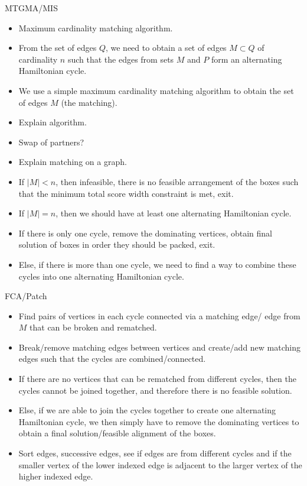 \documentclass[oribibl]{llncs}
\begin{document}
MTGMA/MIS
\begin{itemize}
	\item \cite{mahadev1994} Maximum cardinality matching algorithm.
	\item From the set of edges $Q$, we need to obtain a set of edges $M \subset Q$ of cardinality $n$ such that the edges from sets $M$ and $P$ form an alternating Hamiltonian cycle.
	\item We use a simple maximum cardinality matching algorithm to obtain the set of edges $M$ (the matching).
	\item Explain algorithm.
	\item Swap of partners?
	\item Explain matching on a graph.
	\item If $|M| < n$, then infeasible, there is no feasible arrangement of the boxes such that the minimum total score width constraint is met, exit.
	\item If $|M| = n$, then we should have at least one alternating Hamiltonian cycle.
	\item If there is only one cycle, remove the dominating vertices, obtain final solution of boxes in order they should be packed, exit.
	\item Else, if there is more than one cycle, we need to find a way to combine these cycles into one alternating Hamiltonian cycle.
\end{itemize}

FCA/Patch
\begin{itemize}
	\item Find pairs of vertices in each cycle connected via a matching edge/ edge from $M$ that can be broken and rematched.
	\item Break/remove matching edges between vertices and create/add new matching edges such that the cycles are combined/connected.
	\item If there are no vertices that can be rematched from different cycles, then the cycles cannot be joined together, and therefore there is no feasible solution.
	\item Else, if we are able to join the cycles together to create one alternating Hamiltonian cycle, we then simply have to remove the dominating vertices to obtain a final solution/feasible alignment of the boxes.
	\item Sort edges, successive edges, see if edges are from different cycles and if the smaller vertex of the lower indexed edge is adjacent to the larger vertex of the higher indexed edge.
\end{itemize}
\end{document}
